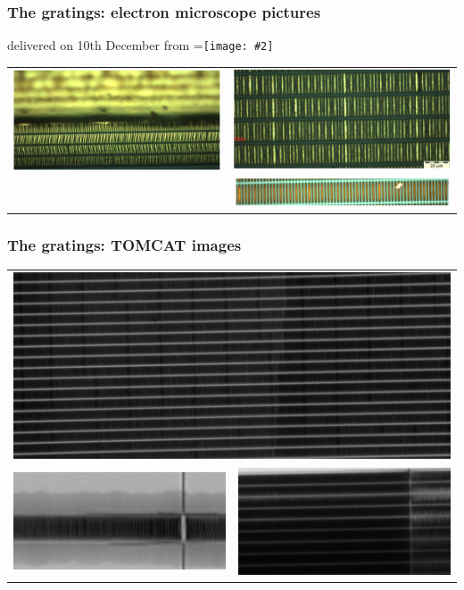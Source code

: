 \documentclass[first,firstsupp]{ETHclass}
\newcommand{\vcenteredinclude}[2]{\begingroup
        \setbox0=\hbox{\texttt{[image: \#2]}}%
        \parbox{\wd0}{\box0}\endgroup}
\begin{document}
    \begin{frame}
        \frametitle{The gratings: electron microscope pictures}
        delivered on 10th December from \vcenteredinclude{width=3cm}{microworks}
        \begin{table}
            \centering
            \begin{tabular}{cc}
                \includegraphics[width=.45\textwidth]{sem3} & 
                \includegraphics[width=.45\textwidth]{sem1}\\
                & \includegraphics[width=.45\textwidth]{sem2}
            \end{tabular}
        \end{table}
    \end{frame}

    \begin{frame}
        \frametitle{The gratings: TOMCAT images}
        \begin{table}
            \centering
            \begin{tabular}{cc}
                \multicolumn{2}{c}{\includegraphics[width=.7\textwidth]{tomcat3}}
                \\
                \includegraphics[width=.35\textwidth]{tomcat1} & 
                \includegraphics[width=.35\textwidth]{tomcat2}
            \end{tabular}
        \end{table}
    \end{frame}
\end{document}
